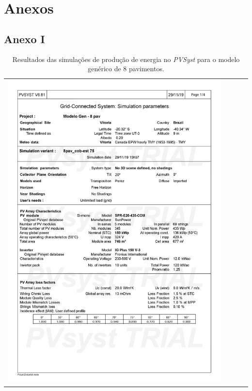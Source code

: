 \section{Anexos}
\subsection{Anexo I}
\begin{table}[H]
    \centering
    \caption{Resultados das simulações de produção de energia no \textit{PVSyst} para o modelo genérico de 8 pavimentos.}
    \begin{tabular}{l}
        \includegraphics[width=0.9\textwidth]{figures/attachments/resultpv1.jpg}
    \end{tabular}
    \label{tab:21}
\end{table}
\pagebreak
